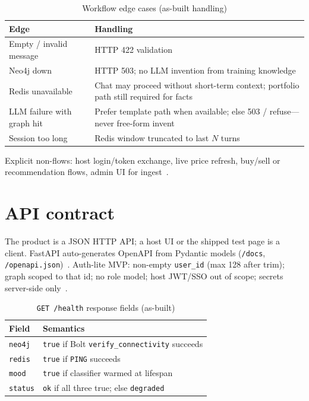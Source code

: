 \begin{table}[!htbp]
\centering
\small
\caption{Workflow edge cases (as-built handling)}
\label{tab:workflow-edges}
\begin{tabularx}{\textwidth}{@{}
  >{\raggedright\arraybackslash}p{}
  >{\raggedright\arraybackslash}X
  @{}}
\toprule
\textbf{Edge} & \textbf{Handling} \\
\midrule
Empty / invalid message & HTTP 422 validation \\
\addlinespace
Neo4j down & HTTP 503; no LLM invention from training knowledge \\
\addlinespace
Redis unavailable & Chat may proceed without short-term context; portfolio path still required for facts \\
\addlinespace
LLM failure with graph hit & Prefer template path when available; else 503 / refuse---never free-form invent \\
\addlinespace
Session too long & Redis window truncated to last $N$ turns \\
\bottomrule
\end{tabularx}
\end{table}

\noindent
Explicit non-flows: host login/token exchange, live price refresh, buy/sell or recommendation flows, admin UI for ingest~\cite{prd}.

\section{API contract}

The product is a JSON HTTP API; a host UI or the shipped test page is a client. FastAPI auto-generates OpenAPI from Pydantic models (\texttt{/docs}, \texttt{/openapi.json})~\cite{fastapi}. Auth-lite MVP: non-empty \texttt{user\_id} (max 128 after trim); graph scoped to that id; no role model; host JWT/SSO out of scope; secrets server-side only~\cite{prd,trd}.

\begin{table}[!htbp]
\centering
\small
\caption{\texttt{GET /health} response fields (as-built)}
\label{tab:api-health}
\begin{tabularx}{\textwidth}{@{}
  >{\raggedright\arraybackslash}p{}
  >{\raggedright\arraybackslash}X
  @{}}
\toprule
\textbf{Field} & \textbf{Semantics} \\
\midrule
\texttt{neo4j} & \texttt{true} if Bolt \texttt{verify\_connectivity} succeeds \\
\addlinespace
\texttt{redis} & \texttt{true} if \texttt{PING} succeeds \\
\addlinespace
\texttt{mood} & \texttt{true} if classifier warmed at lifespan \\
\addlinespace
\texttt{status} & \texttt{ok} if all three true; else \texttt{degraded} \\
\bottomrule
\end{tabularx}
\end{table}

